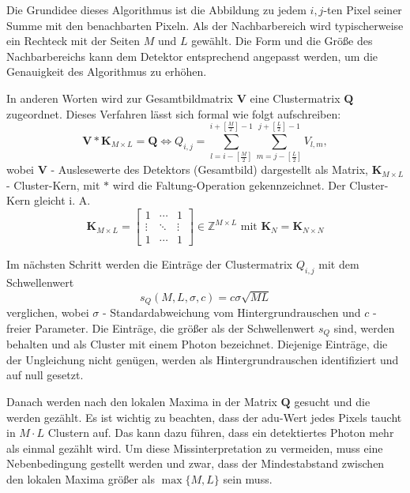 \noindent
Die Grundidee dieses Algorithmus ist die Abbildung zu jedem $i,j$-ten Pixel seiner Summe mit den benachbarten Pixeln. Als der Nachbarbereich wird typischerweise ein Rechteck mit der Seiten $M$ und $L$ gewählt. Die Form und die Größe des Nachbarbereichs kann dem Detektor entsprechend angepasst werden, um die Genauigkeit des Algorithmus zu erhöhen.

\noindent
In anderen Worten wird zur Gesamtbildmatrix $\mathbf{V}$ eine Clustermatrix $\mathbf{Q}$ zugeordnet. Dieses Verfahren lässt sich formal wie folgt aufschreiben:
\begin{equation}
     \mathbf{V} * \mathbf{K}_{M\times L} =  \mathbf{Q} \Leftrightarrow Q_{i, j} = \sum_{l=i-\left[\frac{M}{2}\right]}^{i+\left[\frac{M}{2}\right]-1} \sum_{m=j-\left[\frac{L}{2}\right]}^{j+\left[\frac{L}{2}\right]-1} V_{l,m},
\end{equation}
wobei $\mathbf{V}$ - Auslesewerte des Detektors (Gesamtbild) dargestellt als Matrix, $\mathbf{K}_{M \times L}$ - Cluster-Kern, mit $*$ wird die Faltung-Operation gekennzeichnet. Der Cluster-Kern gleicht i. A.
\begin{equation}
    \mathbf{K}_{M \times L}  = \begin{bmatrix}
1 & \cdots & 1\\
\vdots & \ddots & \vdots\\
1 & \cdots & 1
\end{bmatrix}
\in \mathbb{Z}^{M \times L} \text{ mit } \mathbf{K}_N = \mathbf{K}_{N \times N}
\end{equation}

\noindent
Im nächsten Schritt werden die Einträge der Clustermatrix $Q_{i,j}$ mit dem Schwellenwert 
\begin{equation}
    s_Q(M, L, \sigma, c) = c\sigma\sqrt{ML}
\end{equation}
verglichen, wobei $\sigma$ - Standardabweichung vom Hintergrundrauschen und $c$ - freier Parameter. Die Einträge, die größer als der Schwellenwert $s_Q$ sind, werden behalten und als Cluster mit einem Photon bezeichnet. Diejenige Einträge, die der Ungleichung nicht genügen, werden als Hintergrundrauschen identifiziert und auf null gesetzt.

\noindent
Danach werden nach den lokalen Maxima in der Matrix $\mathbf{Q}$ gesucht und die werden gezählt. Es ist wichtig zu beachten, dass der \gls{adu}-Wert jedes Pixels taucht in $M\cdot L$ Clustern auf. Das kann dazu führen, dass ein detektiertes Photon mehr als einmal gezählt wird. Um diese Missinterpretation zu vermeiden, muss eine Nebenbedingung gestellt werden und zwar, dass der Mindestabstand zwischen den lokalen Maxima größer als $\max\{M,L\}$ sein muss.

